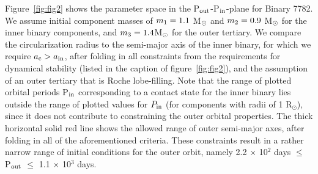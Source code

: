 \documentclass{aastex62}
\def\simon#1{{\bf {\color{red}[#1 -- Simon]}}}
\begin{document}
Figure~\ref{fig:fig2} shows the parameter space in the P$_{\rm
  out}$-P$_{\rm in}$-plane for Binary 7782.  We assume initial
component masses of $m_{\rm 1} = 1.1$ M$_{\rm \odot}$ and $m_{\rm 2} =
0.9$ M$_{\rm \odot}$ for the inner binary components, and $m_{\rm 3} =
1.4 $M$_{\rm \odot}$ for the outer tertiary.  We compare the
circularization radius to the semi-major axis of the inner binary, for
which we require $a_{\rm c} > a_{\rm in}$, after folding in all
constraints from the requirements for dynamical stability (listed in
the caption of figure~\ref{fig:fig2}), and the assumption of an outer tertiary that is Roche
lobe-filling.  
Note that the range of
plotted orbital periods P$_{\rm in}$ corresponding to a contact state
for the inner binary lies outside the range of plotted values for
$P_{\rm in}$ (for components with radii of 1 R$_{\odot}$),
since it does not contribute to constraining the outer orbital
properties.  The thick horizontal solid red line shows the allowed
range of outer semi-major axes, after folding in all of 
the aforementioned criteria.  These constraints result in a rather narrow
range of initial conditions for the outer orbit, namely 2.2 $\times$
10$^{2}$ days $\le$ P$_{\rm out}$ $\le$ 1.1 $\times$ 10$^3$ days.
\end{document}
